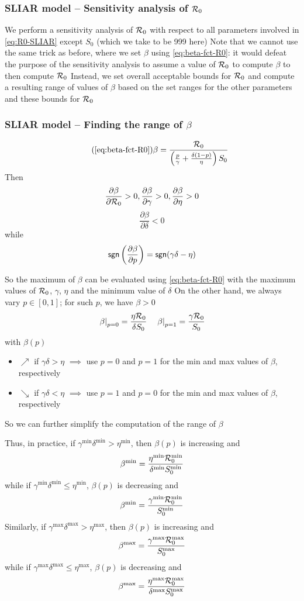 \documentclass[aspectratio=169]{beamer}\usepackage[]{graphicx}\usepackage[]{xcolor}
\begin{document}
\begin{frame}\frametitle{SLIAR model -- Sensitivity analysis of $\mathcal{R}_0$}
We perform a sensitivity analysis of $\mathcal{R}_0$ with respect to all parameters involved in \eqref{eq:R0-SLIAR} except $S_0$ (which we take to be 999 here)
\vfill
Note that we cannot use the same trick as before, where we set $\beta$ using \eqref{eq:beta-fct-R0}: it would defeat the purpose of the sensitivity analysis to assume a value of $\mathcal{R}_0$ to compute $\beta$ to then compute $\mathcal{R}_0$
\vfill
Instead, we set overall acceptable bounds for $\mathcal{R}_0$ and compute a resulting range of values of $\beta$ based on the set ranges for the other parameters and these bounds for $\mathcal{R}_0$
\end{frame}

\begin{frame}\frametitle{SLIAR model -- Finding the range of $\beta$}
\begin{equation}\tag{\ref{eq:beta-fct-R0}}
\beta = \frac{\mathcal{R}_0}{\left(
\frac{p}{\gamma}+\frac{\delta(1-p)}{\eta}
\right)S_0}
\end{equation}
\vfill
Then
\[
\frac{\partial\beta}{\partial \mathcal{R}_0}>0,
\frac{\partial\beta}{\partial \gamma}>0,
\frac{\partial\beta}{\partial \eta}>0
\]
\[
\frac{\partial\beta}{\partial\delta}<0
\]
while 
\[
\mathsf{sgn}\left(\frac{\partial\beta}{\partial p}\right)=\mathsf{sgn}(\gamma\delta-\eta)
\]
\end{frame}

\begin{frame}
So the maximum of $\beta$ can be evaluated using \eqref{eq:beta-fct-R0} with the maximum values of $\mathcal{R}_0$, $\gamma$, $\eta$ and the minimum value of $\delta$
\vfill
On the other hand, we always vary $p\in[0,1]$; for such $p$, we have $\beta>0$
\[
\left.\beta\right|_{p=0} = \frac{\eta\mathcal{R}_0}{\delta S_0}\quad
\left.\beta\right|_{p=1} = \frac{\gamma\mathcal{R}_0}{S_0}
\]
with $\beta(p)$ 
\begin{itemize}
\item $\nearrow$ if $\gamma\delta>\eta$ $\implies$ use $p=0$ and $p=1$ for the min and max values of $\beta$, respectively
\item $\searrow$ if $\gamma\delta<\eta$ $\implies$ use $p=1$ and $p=0$ for the min and max values of $\beta$, respectively
\end{itemize}
\vfill
So we can further simplify the computation of the range of $\beta$
\end{frame}

\begin{frame}
Thus, in practice, if $\gamma^{\min}\delta^{\min}>\eta^{\min}$, then $\beta(p)$ is increasing and
\[
\beta^{\min}=\frac{\eta^{\min}\mathcal{R}_0^{\min}}{\delta^{\min} S_0^{\min}}
\]
while if $\gamma^{\min}\delta^{\min}\leq\eta^{\min}$, $\beta(p)$ is decreasing and 
\[
\beta^{\min}=\frac{\gamma^{\min}\mathcal{R}_0^{\min}}{S_0^{\min}}
\]
\vfill
Similarly, if $\gamma^{\max}\delta^{\max}>\eta^{\max}$, then $\beta(p)$ is increasing and
\[
\beta^{\max}=\frac{\gamma^{\max}\mathcal{R}_0^{\max}}{S_0^{\max}}
\]
while if $\gamma^{\max}\delta^{\max}\leq\eta^{\max}$, $\beta(p)$ is decreasing and 
\[
\beta^{\max}=\frac{\eta^{\max}\mathcal{R}_0^{\max}}{\delta^{\max} S_0^{\max}}
\]
\end{frame}
\end{document}
